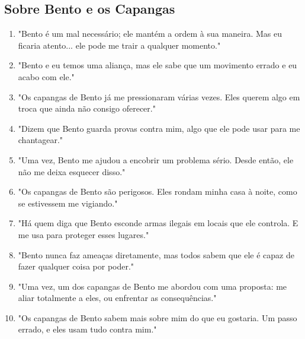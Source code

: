 \subsection*{Sobre Bento e os Capangas}
\begin{enumerate}
    \item "Bento é um mal necessário; ele mantém a ordem à sua maneira. Mas eu ficaria atento... ele pode me trair a qualquer momento."
    \item "Bento e eu temos uma aliança, mas ele sabe que um movimento errado e eu acabo com ele."
    \item "Os capangas de Bento já me pressionaram várias vezes. Eles querem algo em troca que ainda não consigo oferecer."
    \item "Dizem que Bento guarda provas contra mim, algo que ele pode usar para me chantagear."
    \item "Uma vez, Bento me ajudou a encobrir um problema sério. Desde então, ele não me deixa esquecer disso."
    \item "Os capangas de Bento são perigosos. Eles rondam minha casa à noite, como se estivessem me vigiando."
    \item "Há quem diga que Bento esconde armas ilegais em locais que ele controla. E me usa para proteger esses lugares."
    \item "Bento nunca faz ameaças diretamente, mas todos sabem que ele é capaz de fazer qualquer coisa por poder."
    \item "Uma vez, um dos capangas de Bento me abordou com uma proposta: me aliar totalmente a eles, ou enfrentar as consequências."
    \item "Os capangas de Bento sabem mais sobre mim do que eu gostaria. Um passo errado, e eles usam tudo contra mim."
\end{enumerate}

